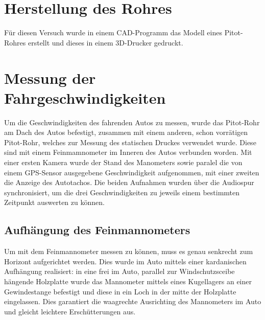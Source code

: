 \section{Herstellung des Rohres}
Für diesen Versuch wurde in einem CAD-Programm das Modell eines Pitot-Rohres erstellt und dieses in einem 3D-Drucker gedruckt.

\section{Messung der Fahrgeschwindigkeiten}
Um die Geschwindigkeiten des fahrenden Autos zu messen, wurde das Pitot-Rohr am Dach des Autos befestigt, zusammen mit einem anderen, schon vorrätigen Pitot-Rohr, welches zur Messung des statischen Druckes verwendet wurde. Diese sind mit einem Feinmamnometer im Inneren des Autos verbunden worden. Mit einer ersten Kamera wurde der Stand des Manometers sowie paralel die von einem GPS-Sensor ausgegebene Geschwindigkeit aufgenommen, mit einer zweiten die Anzeige des Autotachos. Die beiden Aufnahmen wurden über die Audiospur synchronisiert, um die drei Geschwindigkeiten zu jeweils einem bestimmten Zeitpunkt auswerten zu können.

\subsection{Aufhängung des Feinmannometers}
Um mit dem Feinmannometer messen zu können, muss es genau senkrecht zum Horizont aufgerichtet werden. Dies wurde im Auto mittels einer kardanischen Aufhängung realisiert: in eine frei im Auto, parallel zur Windschutzsceibe hängende Holzplatte wurde das Mannometer mittels eines Kugellagers an einer Gewindestange befestigt und diese in ein Loch in der mitte der Holzplatte eingelassen. Dies garantiert die waagrechte Ausrichting des Mannometers im Auto und gleicht leichtere Erschütterungen aus. 
